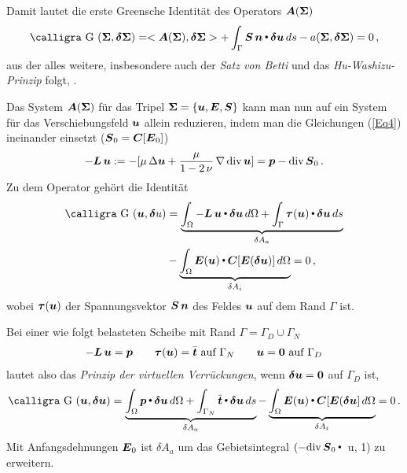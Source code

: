 Damit lautet die erste Greensche Identit\"{a}t des Operators $\mbox{\boldmath $A$}(\mbox{\boldmath $\Sigma$})$
\begin{align}
\text{\normalfont\calligra G\,\,}(\vek \Sigma,\vek  \delta \vek \Sigma) = <\vek A(\vek \Sigma), \vek  \delta \vek \Sigma> + \int_{\Gamma}\vek S\,\vek n \dotprod  \vek \delta \vek u\,ds - a(\vek \Sigma, \vek  \delta\vek \Sigma) = 0\,,
\end{align}
aus der alles weitere, insbesondere auch der {\em Satz von Betti\/} und das {\em Hu-Washizu-Prinzip\/} folgt, \cite{Ha1}.

Das System $\mbox{\boldmath $A$}(\mbox{\boldmath $\Sigma$})$ f\"{u}r das Tripel $\mbox{\boldmath $\Sigma$} = \{\mbox{\boldmath $u$}, \mbox{\boldmath $E$}, \mbox{\boldmath $S$}\}$ kann man nun auf ein System f\"{u}r das Verschiebungsfeld $\mbox{\boldmath $u$}$ allein reduzieren, indem man die Gleichungen (\ref{Eq4}) ineinander einsetzt ($\mbox{\boldmath $S$}_0 = \mbox{\boldmath $C$}[\mbox{\boldmath $E$}_0]$)
\begin{align}
- \mbox{\boldmath $L$}\,\mbox{\boldmath $u$} := - [\mu\,\Delta \mbox{\boldmath $u$} + \frac{\mu}{1 - 2\,\nu} \,\nabla\,\text{div}\,\mbox{\boldmath $u$} ]= \mbox{\boldmath $p$} - \text{div} \,\mbox{\boldmath $S$}_0\,.
\end{align}
Zu dem Operator geh\"{o}rt die Identit\"{a}t
\begin{align}
\text{\normalfont\calligra G\,\,}(\vek u,\vek  \delta u) &= \underbrace{\int_{\Omega}- \vek L\,\vek u \dotprod  \vek \delta \vek u\,d\Omega + \int_{\Gamma} \vek \tau(\vek u) \dotprod \vek \delta \vek u\,ds}_{\delta A_a}\nn \\
 &- \underbrace{\int_{\Omega} \vek E(\vek u) \dotprod \vek C[\vek E(\vek  \delta\vek u)] \,d\Omega}_{\delta A_i} = 0\,,
\end{align}
wobei $\mbox{\boldmath $\tau$}(\mbox{\boldmath $u$})$ der Spannungsvektor $\mbox{\boldmath $S$}\,\mbox{\boldmath $n$}$ des Feldes $\mbox{\boldmath $u$}$ auf dem Rand $\Gamma$ ist.

Bei einer wie folgt belasteten Scheibe mit Rand $\Gamma = \Gamma_D \cup \Gamma_N$
\begin{align}
- \mbox{\boldmath $L$}\,\mbox{\boldmath $u$} = \mbox{\boldmath $p$} \qquad \mbox{\boldmath $\tau$}(\mbox{\boldmath $u$}) = \bar{\mbox{\boldmath $t$}} \,\,\text{auf $\Gamma_N$} \qquad \mbox{\boldmath $u$} = \mbox{\boldmath $0$} \,\,\text{auf $\Gamma_D$}
\end{align}
lautet also das {\em Prinzip der virtuellen Verr\"{u}ckungen\/}, wenn $\mbox{\boldmath $\delta$} \mbox{\boldmath $u$} = \mbox{\boldmath $0$}$ auf $\Gamma_D$ ist,
\begin{align}
\text{\normalfont\calligra G\,\,}(\vek u,\vek  \delta \vek u) = \underbrace{\int_{\Omega} \vek p \dotprod  \vek  \delta \vek u\,d\Omega + \int_{\Gamma_N} \bar{\vek t} \dotprod \vek  \delta \vek u\,ds}_{\delta A_a} - \underbrace{\int_{\Omega} \vek E(\vek u) \dotprod \vek C[\vek E(\vek \delta \vek  u] \,d\Omega}_{\delta A_i} = 0\,.
\end{align}
Mit Anfangsdehnungen $\mbox{\boldmath $E$}_0$ ist $\delta A_a$ um das Gebietsintegral $(- \text{div}\,\mbox{\boldmath $S$}_0 {\,\scriptscriptstyle \stackrel{\bullet}{{}}}\,$ \vek  \delta \vek u, 1) zu erweitern.

